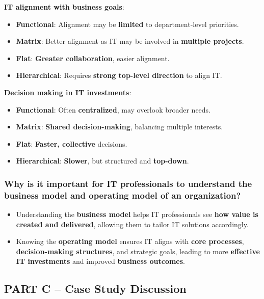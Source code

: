 \noindent\textbf{IT alignment with business goals}: 

\begin{itemize}
    \item \textbf{Functional}: Alignment may be \textbf{limited} to department-level priorities.
    \item \textbf{Matrix}: Better alignment as IT may be involved in \textbf{multiple projects}.
    \item \textbf{Flat}: \textbf{Greater collaboration}, easier alignment.
    \item \textbf{Hierarchical}: Requires \textbf{strong top-level direction} to align IT.
\end{itemize}

\noindent\textbf{Decision making in IT investments}: 

\begin{itemize}
    \item \textbf{Functional}: Often \textbf{centralized}, may overlook broader needs.
    \item \textbf{Matrix}: \textbf{Shared decision-making}, balancing multiple interests.
    \item \textbf{Flat}: \textbf{Faster, collective} decisions.
    \item \textbf{Hierarchical}: \textbf{Slower}, but structured and \textbf{top-down}.
\end{itemize}

\subsubsection{Why is it important for IT professionals to understand the business model and operating model of an organization?}

\begin{itemize}
    \item Understanding the \textbf{business model} helps IT professionals see\textbf{ how value is created and delivered}, allowing them to tailor IT solutions accordingly.
    \item Knowing the \textbf{operating model} ensures IT aligns with \textbf{core processes}, \textbf{decision-making structures}, and strategic goals, leading to more \textbf{effective IT investments} and improved \textbf{business outcomes}.
\end{itemize}

\subsection{PART C – Case Study Discussion}

